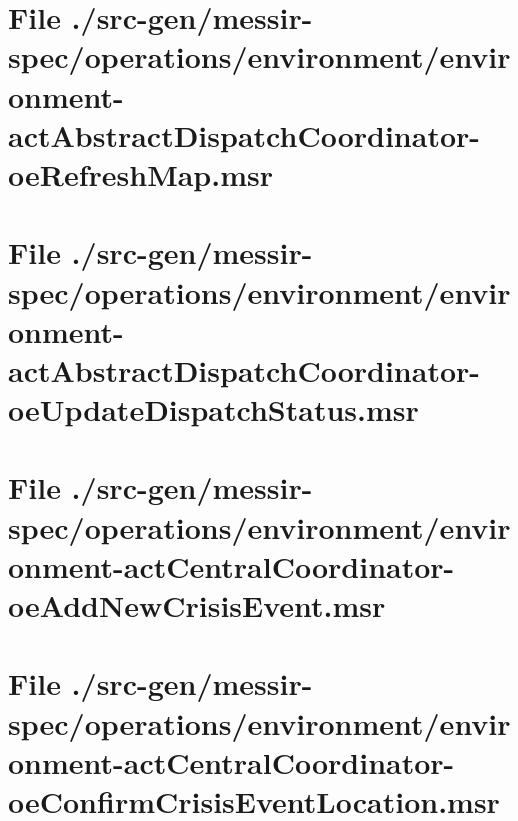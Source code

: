 \section[File /src-gen.../environment-actAbstractDispatchCoordinator-oeRefreshMap.msr]{File ./src-gen/messir-spec/operations/environment/environment-actAbstractDispatchCoordinator-oeRefreshMap.msr}
\scriptsize

\normalsize
	
\section[File /.../environment-actAbstractDispatchCoordinator-oeUpdateDispatchStatus.msr]{File ./src-gen/messir-spec/operations/environment/environment-actAbstractDispatchCoordinator-oeUpdateDispatchStatus.msr}
\scriptsize

\normalsize
	
\section[File /src-gen.../environment-actCentralCoordinator-oeAddNewCrisisEvent.msr]{File ./src-gen/messir-spec/operations/environment/environment-actCentralCoordinator-oeAddNewCrisisEvent.msr}
\scriptsize

\normalsize
	
\section[File /.../environment-actCentralCoordinator-oeConfirmCrisisEventLocation.msr]{File ./src-gen/messir-spec/operations/environment/environment-actCentralCoordinator-oeConfirmCrisisEventLocation.msr}
\scriptsize

\normalsize
	
